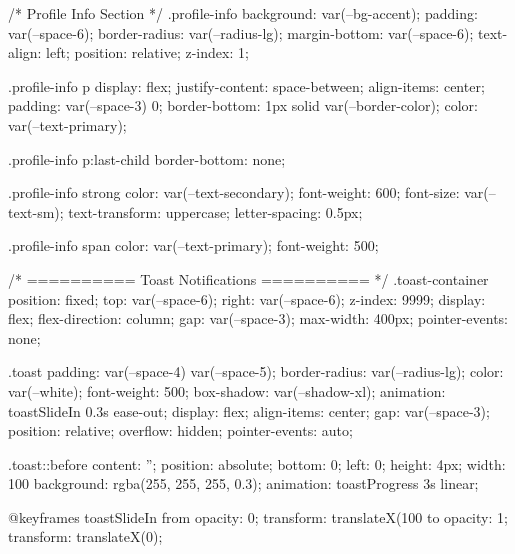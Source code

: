 /* Profile Info Section */
.profile-info {
  background: var(--bg-accent);
  padding: var(--space-6);
  border-radius: var(--radius-lg);
  margin-bottom: var(--space-6);
  text-align: left;
  position: relative;
  z-index: 1;
}

.profile-info p {
  display: flex;
  justify-content: space-between;
  align-items: center;
  padding: var(--space-3) 0;
  border-bottom: 1px solid var(--border-color);
  color: var(--text-primary);
}

.profile-info p:last-child {
  border-bottom: none;
}

.profile-info strong {
  color: var(--text-secondary);
  font-weight: 600;
  font-size: var(--text-sm);
  text-transform: uppercase;
  letter-spacing: 0.5px;
}

.profile-info span {
  color: var(--text-primary);
  font-weight: 500;
}

/* ========== Toast Notifications ========== */
.toast-container {
  position: fixed;
  top: var(--space-6);
  right: var(--space-6);
  z-index: 9999;
  display: flex;
  flex-direction: column;
  gap: var(--space-3);
  max-width: 400px;
  pointer-events: none;
}

.toast {
  padding: var(--space-4) var(--space-5);
  border-radius: var(--radius-lg);
  color: var(--white);
  font-weight: 500;
  box-shadow: var(--shadow-xl);
  animation: toastSlideIn 0.3s ease-out;
  display: flex;
  align-items: center;
  gap: var(--space-3);
  position: relative;
  overflow: hidden;
  pointer-events: auto;
}

.toast::before {
  content: '';
  position: absolute;
  bottom: 0;
  left: 0;
  height: 4px;
  width: 100%
  background: rgba(255, 255, 255, 0.3);
  animation: toastProgress 3s linear;
}

@keyframes toastSlideIn {
  from {
    opacity: 0;
    transform: translateX(100%
  }
  to {
    opacity: 1;
    transform: translateX(0);
  }
}

